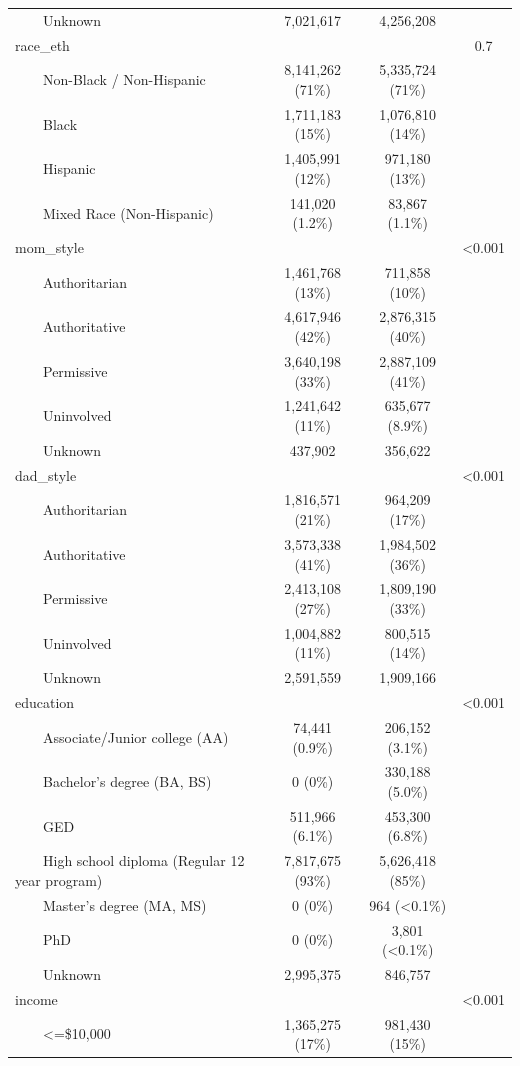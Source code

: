 \documentclass[
]{article}
\begin{document}
\begin{table}[t]
\begin{tabular*}{\linewidth}{@{\extracolsep{\fill}}lccc}
    Unknown & 7,021,617 & 4,256,208 &  \\ 
race\_eth &  &  & 0.7 \\ 
    Non-Black / Non-Hispanic & 8,141,262 (71\%) & 5,335,724 (71\%) &  \\ 
    Black & 1,711,183 (15\%) & 1,076,810 (14\%) &  \\ 
    Hispanic & 1,405,991 (12\%) & 971,180 (13\%) &  \\ 
    Mixed Race (Non-Hispanic) & 141,020 (1.2\%) & 83,867 (1.1\%) &  \\ 
mom\_style &  &  & <0.001 \\ 
    Authoritarian & 1,461,768 (13\%) & 711,858 (10\%) &  \\ 
    Authoritative & 4,617,946 (42\%) & 2,876,315 (40\%) &  \\ 
    Permissive & 3,640,198 (33\%) & 2,887,109 (41\%) &  \\ 
    Uninvolved & 1,241,642 (11\%) & 635,677 (8.9\%) &  \\ 
    Unknown & 437,902 & 356,622 &  \\ 
dad\_style &  &  & <0.001 \\ 
    Authoritarian & 1,816,571 (21\%) & 964,209 (17\%) &  \\ 
    Authoritative & 3,573,338 (41\%) & 1,984,502 (36\%) &  \\ 
    Permissive & 2,413,108 (27\%) & 1,809,190 (33\%) &  \\ 
    Uninvolved & 1,004,882 (11\%) & 800,515 (14\%) &  \\ 
    Unknown & 2,591,559 & 1,909,166 &  \\ 
education &  &  & <0.001 \\ 
    Associate/Junior college (AA) & 74,441 (0.9\%) & 206,152 (3.1\%) &  \\ 
    Bachelor's degree (BA, BS) & 0 (0\%) & 330,188 (5.0\%) &  \\ 
    GED & 511,966 (6.1\%) & 453,300 (6.8\%) &  \\ 
    High school diploma (Regular 12 year program) & 7,817,675 (93\%) & 5,626,418 (85\%) &  \\ 
    Master's degree (MA, MS) & 0 (0\%) & 964 (<0.1\%) &  \\ 
    PhD & 0 (0\%) & 3,801 (<0.1\%) &  \\ 
    Unknown & 2,995,375 & 846,757 &  \\ 
income &  &  & <0.001 \\ 
    <=\$10,000 & 1,365,275 (17\%) & 981,430 (15\%) &  \\ 

\end{tabular*}
\end{table}
\end{document}
